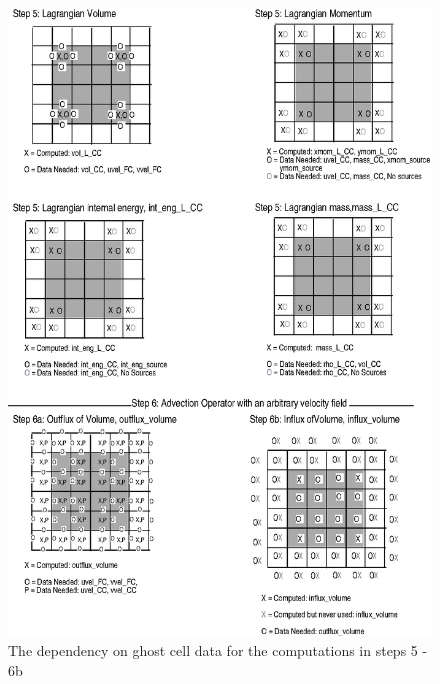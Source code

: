 \documentclass[fleqn]{article}
\begin{document}
{\begin{figure}
    \includegraphics{boundarycond_pg2.eps}
    \caption{The dependency on ghost cell data for the computations in steps 5 - 6b}
    \label{fig:boundarycondpg2}
\end{figure}
%
%
\begin{figure}
    \center

\end{figure}}
\end{document}
